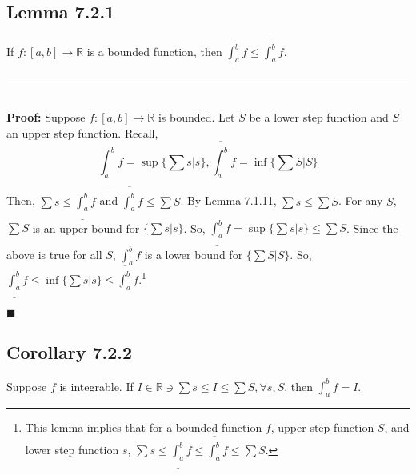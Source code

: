 \documentclass[11pt]{book}
\newcommand{\R}{\mathbb{R}}
\newcommand{\horline}{\noindent\rule{14.25cm}{0.6pt}\\}
\newcounter{lemma}
\newcommand{\QED}{\begin{flushright}$\blacksquare$\end{flushright}}
\begin{document}
		\subsection{ Lemma 7.2.1}
		\label{subsec:lemm721}
			\begin{lemm}
				If $f: [a,b] \to \R$ is a bounded function, then $\underline{\int_a^b}{f} \leq \overline{\int_a^b}{f}$.\hfill\break
				\horline
				\textbf{Proof:} Suppose $f:[a,b] \to \R$ is bounded. Let $S$ be a lower step function and $S$ an upper step function. Recall, 
				$$\underline{\int_a^b}{f} = \sup{\{\sum s | s \}}, \overline{\int_a^b}{f} = \inf{\{\sum S | S \}}$$
				Then, $\sum s \leq \underline{\int_a^b}{f}$ and $\overline{\int_a^b}{f} \leq \sum S$. By Lemma 7.1.11, $\sum{s} \leq \sum{S}$. For any $S$, $\sum{S}$ is an upper 
				bound for $\{\sum{s} | s\}$. So, $\underline{\int_a^b}{f} = \sup{ \{\sum{s} | s\}} \leq \sum{S}$. Since the above is true for all $S$, $\int_a^b{f}$ is a lower bound for 
				$\{\sum{S} | S\}$. So, $\underline{\int_a^b}{f} \leq \inf{\{\sum{s} | s \}} \leq \overline{\int_a^b}{f}$.\footnote{This lemma implies that for a bounded function $f$, 
				upper step function $S$, and lower step function $s$, $\sum{s} \leq \underline{\int_a^b}{f} \leq \overline{\int_a^b}{f} \leq \sum{S}$.}
				\QED
			\end{lemm}
		
		\subsection{Corollary 7.2.2}
		\label{subsec:cor722}
			\begin{cor}
				Suppose $f$ is integrable. If $I \in \R \ni \sum{s} \leq I \leq \sum{S}, \forall s, S$, then $\int_a^b{f} = I$.
			\end{cor}
\end{document}
